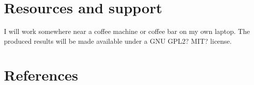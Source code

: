 \documentclass{article}
\begin{document}
\section{Resources and support}
I will work somewhere near a coffee machine or coffee bar on my own laptop. The produced results will be made available under a GNU GPL2? MIT? license.

\section{References}
{}

\end{document}
